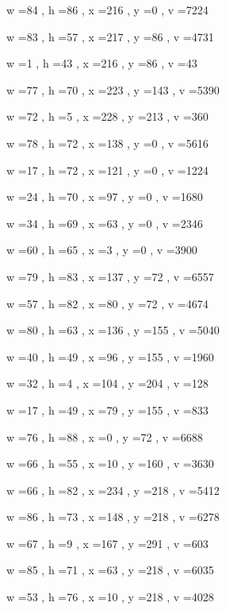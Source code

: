 \documentclass[11pt]{article}
\begin{document}
w =84 , h =86 , x =216 , y =0 , v =7224
\par
w =83 , h =57 , x =217 , y =86 , v =4731
\par
w =1 , h =43 , x =216 , y =86 , v =43
\par
w =77 , h =70 , x =223 , y =143 , v =5390
\par
w =72 , h =5 , x =228 , y =213 , v =360
\par
w =78 , h =72 , x =138 , y =0 , v =5616
\par
w =17 , h =72 , x =121 , y =0 , v =1224
\par
w =24 , h =70 , x =97 , y =0 , v =1680
\par
w =34 , h =69 , x =63 , y =0 , v =2346
\par
w =60 , h =65 , x =3 , y =0 , v =3900
\par
w =79 , h =83 , x =137 , y =72 , v =6557
\par
w =57 , h =82 , x =80 , y =72 , v =4674
\par
w =80 , h =63 , x =136 , y =155 , v =5040
\par
w =40 , h =49 , x =96 , y =155 , v =1960
\par
w =32 , h =4 , x =104 , y =204 , v =128
\par
w =17 , h =49 , x =79 , y =155 , v =833
\par
w =76 , h =88 , x =0 , y =72 , v =6688
\par
w =66 , h =55 , x =10 , y =160 , v =3630
\par
w =66 , h =82 , x =234 , y =218 , v =5412
\par
w =86 , h =73 , x =148 , y =218 , v =6278
\par
w =67 , h =9 , x =167 , y =291 , v =603
\par
w =85 , h =71 , x =63 , y =218 , v =6035
\par
w =53 , h =76 , x =10 , y =218 , v =4028
\par
\newpage
\end{document}
